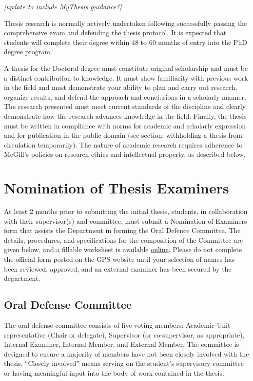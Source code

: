 \documentclass[
  openany]{book}
\begin{document}
\emph{{[}update to include MyThesis guidance?{]}}

Thesis research is normally actively undertaken following successfully passing the comprehensive exam and defending the thesis protocol. It is expected that students will complete their degree within 48 to 60 months of entry into the PhD degree program.

A thesis for the Doctoral degree must constitute original scholarship and must be a distinct contribution to knowledge. It must show familiarity with previous work in the field and must demonstrate your ability to plan and carry out research, organize results, and defend the approach and conclusions in a scholarly manner. The research presented must meet current standards of the discipline and clearly demonstrate how the research advances knowledge in the field. Finally, the thesis must be written in compliance with norms for academic and scholarly expression and for publication in the public domain (see section: withholding a thesis from circulation temporarily). The nature of academic research requires adherence to McGill's policies on research ethics and intellectual property, as described below.

\hypertarget{nomination-of-thesis-examiners}{%
\section{Nomination of Thesis Examiners}\label{nomination-of-thesis-examiners}}

At least 2 months prior to submitting the initial thesis, students, in collaboration with their supervisor(s) and committee, must submit a Nomination of Examiners form that assists the Department in forming the Oral Defence Committee. The details, procedures, and specifications for the composition of the Committee are given below, and a fillable worksheet is available \href{https://www.mcgill.ca/epi-biostat-occh/files/epi-biostat-occh/eboh_phd_nom_exam_worksheet_201911.docx}{online}. Please do not complete the official form posted on the GPS website until your selection of names has been reviewed, approved, and an external examiner has been secured by the department.

\hypertarget{oral-defense-committee}{%
\subsection{Oral Defense Committee}\label{oral-defense-committee}}

The oral defense committee consists of five voting members: Academic Unit representative (Chair or delegate), Supervisor (or co-supervisor, as appropriate), Internal Examiner, Internal Member, and External Member. The committee is designed to ensure a majority of members have not been closely involved with the thesis. ``Closely involved'' means serving on the student's supervisory committee or having meaningful input into the body of work contained in the thesis.
\end{document}

